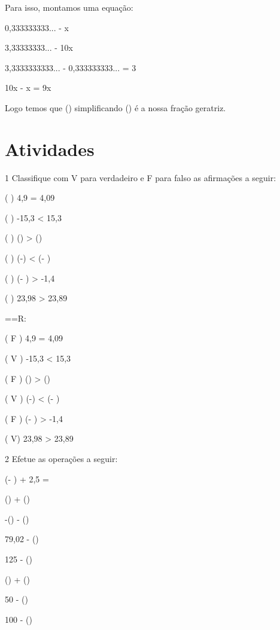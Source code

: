 Para isso, montamos uma equação:

0,333333333... - x

3,33333333... - 10x

3,3333333333... - 0,333333333... = 3

10x - x = 9x

Logo temos que () simplificando () é a nossa
fração geratriz.

\section{Atividades}

\num{1} Classifique com V para verdadeiro e F para falso as afirmações a
seguir:

( ) 4,9 = 4,09

( ) -15,3 \textless{} 15,3

( ) () \textgreater{} ()

( ) (-) \textless{} (- )

( ) (- ) \textgreater{} -1,4

( ) 23,98 \textgreater{} 23,89

==R:

( F ) 4,9 = 4,09

( V ) -15,3 \textless{} 15,3

( F ) () \textgreater{} ()

( V ) (-) \textless{} (- )

( F ) (- ) \textgreater{} -1,4

( V) 23,98 \textgreater{} 23,89

\num{2} Efetue as operações a seguir:

\item (- ) + 2,5 =
\item () + ()
\item -() - ()
\item 79,02 - ()
\item 125 - ()
\item () + ()
\item 50 - ()
\item 100 - ()

